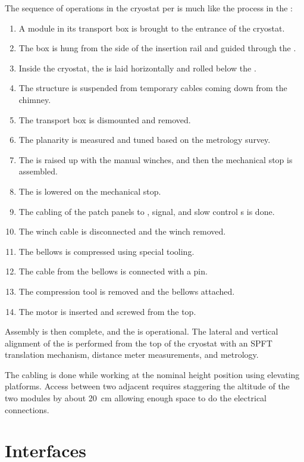 The sequence of operations in the cryostat per  is much like the process in the : 
\begin{enumerate}
\item A  module in its transport box is brought to the entrance of the cryostat.
\item The box is hung from the side of the insertion rail and guided through the .
\item  Inside the cryostat, the  is laid horizontally and rolled below the .
\item The structure is suspended from temporary cables coming down from the chimney.
\item The transport box is dismounted and removed.
\item The  planarity is measured and tuned based on the metrology survey.
\item The  is raised up with the manual winches, and then the mechanical stop is assembled.
\item The  is lowered on the mechanical stop.
\item The cabling of the  patch panels to , signal, and slow control \fdth{}s is done.
\item The winch cable is disconnected  and the winch removed.
\item The bellows is compressed using special tooling.
\item The cable from the bellows is connected with a pin.
\item The compression tool is removed and the bellows attached.
\item The motor is inserted and screwed from the top.
\end{enumerate}
 

Assembly is then complete, and the  is operational.
The lateral and vertical alignment of the  is performed from the top of the cryostat with an SPFT translation mechanism, distance meter measurements, and metrology.

The cabling is done while working at the nominal height position using elevating platforms. Access between two adjacent  requires staggering the altitude of the two modules by about \SI{20}{cm} allowing enough space to do the electrical connections. 

\section{Interfaces}
\label{sec:dp-crp-interfaces}

